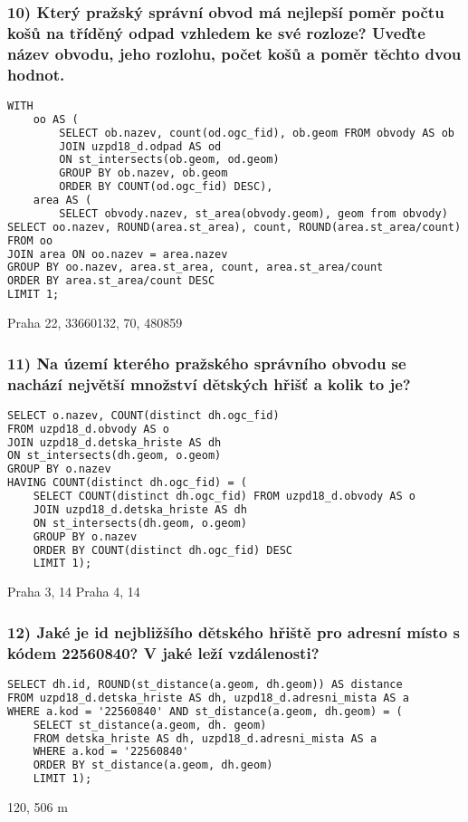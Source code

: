\documentclass[a4paper, 12pt]{article}
\begin{document}
\subsubsection*{10) Který pražský správní obvod má nejlepší poměr počtu košů na tříděný odpad vzhledem ke své rozloze? Uveďte název obvodu, jeho rozlohu, počet košů a poměr těchto dvou hodnot.}
\begin{lstlisting}[language=html]
WITH 
    oo AS (
        SELECT ob.nazev, count(od.ogc_fid), ob.geom FROM obvody AS ob
        JOIN uzpd18_d.odpad AS od 
        ON st_intersects(ob.geom, od.geom)
        GROUP BY ob.nazev, ob.geom
        ORDER BY COUNT(od.ogc_fid) DESC),
    area AS (
        SELECT obvody.nazev, st_area(obvody.geom), geom from obvody)
SELECT oo.nazev, ROUND(area.st_area), count, ROUND(area.st_area/count) AS ratio 
FROM oo
JOIN area ON oo.nazev = area.nazev
GROUP BY oo.nazev, area.st_area, count, area.st_area/count
ORDER BY area.st_area/count DESC
LIMIT 1;
\end{lstlisting}
Praha 22, 33660132, 70, 480859
\vspace{0.8cm}

\subsubsection*{11) Na území kterého pražského správního obvodu se nachází největší množství dětských hřišť a kolik to je?}
\begin{lstlisting}[language=html]
SELECT o.nazev, COUNT(distinct dh.ogc_fid) 
FROM uzpd18_d.obvody AS o 
JOIN uzpd18_d.detska_hriste AS dh 
ON st_intersects(dh.geom, o.geom) 
GROUP BY o.nazev
HAVING COUNT(distinct dh.ogc_fid) = (
    SELECT COUNT(distinct dh.ogc_fid) FROM uzpd18_d.obvody AS o 
    JOIN uzpd18_d.detska_hriste AS dh 
    ON st_intersects(dh.geom, o.geom) 
    GROUP BY o.nazev 
    ORDER BY COUNT(distinct dh.ogc_fid) DESC 
    LIMIT 1);
\end{lstlisting}
\begin{flushleft}
Praha 3, 14 \linebreak
Praha 4, 14
\end{flushleft}

\subsubsection*{12) Jaké je id nejbližšího dětského hřiště pro adresní místo s kódem 22560840? V jaké leží vzdálenosti?}
\begin{lstlisting}[language=html]
SELECT dh.id, ROUND(st_distance(a.geom, dh.geom)) AS distance 
FROM uzpd18_d.detska_hriste AS dh, uzpd18_d.adresni_mista AS a
WHERE a.kod = '22560840' AND st_distance(a.geom, dh.geom) = (
    SELECT st_distance(a.geom, dh. geom) 
    FROM detska_hriste AS dh, uzpd18_d.adresni_mista AS a
    WHERE a.kod = '22560840' 
    ORDER BY st_distance(a.geom, dh.geom)
    LIMIT 1);
\end{lstlisting}
120, 506 m
\end{document}
